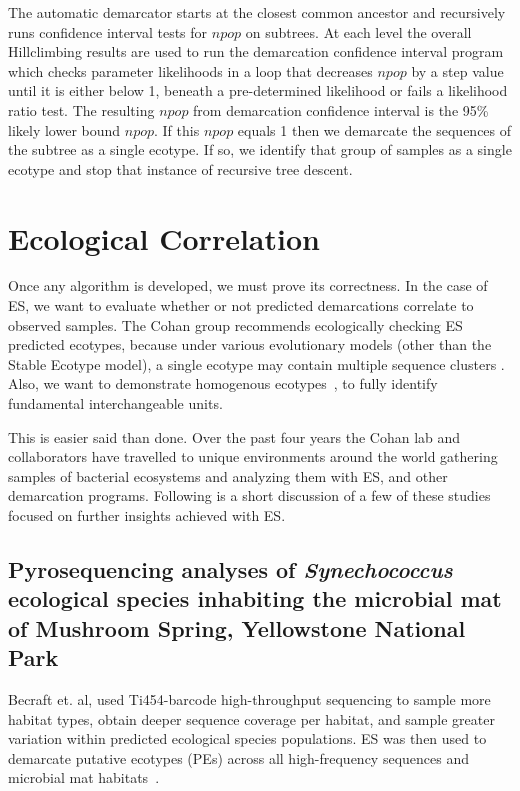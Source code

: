 The automatic demarcator starts at the closest common ancestor and recursively runs confidence interval tests for $npop$ on subtrees.
At each level the overall Hillclimbing results are used to run the demarcation confidence interval program which checks parameter likelihoods in a loop that decreases $npop$ by a step value until it is either below 1, beneath a pre-determined likelihood or fails a likelihood ratio test.
The resulting $npop$ from demarcation confidence interval is the 95\% likely lower bound $npop$.
If this $npop$ equals 1 then we demarcate the sequences of the subtree as a single ecotype.
If so, we identify that group of samples as a single ecotype and stop that instance of recursive tree descent.

\section{Ecological Correlation}
Once any algorithm is developed, we must prove its correctness.
In the case of ES, we want to evaluate whether or not predicted demarcations correlate to observed samples.
The Cohan group recommends ecologically checking ES predicted ecotypes, because under various evolutionary models (other than the Stable Ecotype model), a single ecotype may contain multiple sequence clusters \cite{koeppel2008identifying, connor2010ecology}.
Also, we want to demonstrate homogenous ecotypes~\cite{wiedenbeckHGT}, to fully identify fundamental interchangeable units.

This is easier said than done.
Over the past four years the Cohan lab and collaborators have travelled to unique environments around the world gathering samples of bacterial ecosystems and analyzing them with ES, and other demarcation programs.
Following is a short discussion of a few of these studies focused on further insights achieved with ES.

\subsection*{Pyrosequencing analyses of \emph{Synechococcus} ecological species inhabiting the microbial mat of Mushroom Spring, Yellowstone National Park}
Becraft et. al, used Ti454-barcode high-throughput sequencing to sample more habitat types, obtain deeper sequence coverage per habitat, and sample greater variation within predicted ecological species populations.
ES was then used to demarcate putative ecotypes (PEs) across all high-frequency sequences and microbial mat habitats~\cite{pyroEric}.

